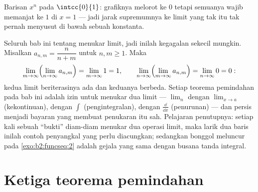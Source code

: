 \begin{omfigure}

{\small Barisan $x^n$ pada $\intcc{0}{1}$: grafiknya melorot ke
$0$ tetapi semuanya wajib memanjat ke $1$ di $x = 1$ --- jadi jarak
supremumnya ke limit  yang tak  itu tak pernah
menyusut di bawah sebuah konstanta.}
\end{omfigure}

\begin{example}\label{ex:b2:funcseq:doublelimit}
Seluruh bab ini tentang menukar limit, jadi inilah kegagalan
sekecil mungkin. Misalkan $a_{n,m} = \dfrac{n}{n+m}$ untuk
$n, m \geq 1$. Maka
\[
\lim_{m\to\infty}\Bigl(\lim_{n\to\infty}a_{n,m}\Bigr)
= \lim_{m\to\infty} 1 = 1,
\qquad
\lim_{n\to\infty}\Bigl(\lim_{m\to\infty}a_{n,m}\Bigr)
= \lim_{n\to\infty} 0 = 0 :
\]
kedua limit beriterasinya ada dan keduanya berbeda. Setiap teorema
pemindahan pada bab ini adalah izin untuk menukar dua limit ---
$\lim_n$ dengan $\lim_{x\to a}$ (kekontinuan), dengan $\int$
(pengintegralan), dengan $\frac{\dd}{\dd x}$ (penurunan) ---
dan  persis menjadi bayaran yang membuat
penukaran itu sah. Pelajaran penutupnya: setiap kali sebuah ``bukti''
diam-diam menukar dua operasi limit, maka larik dua baris inilah
contoh penyangkal yang perlu diacungkan; sedangkan bonggol meluncur pada
\cref{exo:b2:funcseq:2} adalah gejala yang sama dengan busana
tanda integral.
\end{example}

\section{Ketiga teorema pemindahan}

